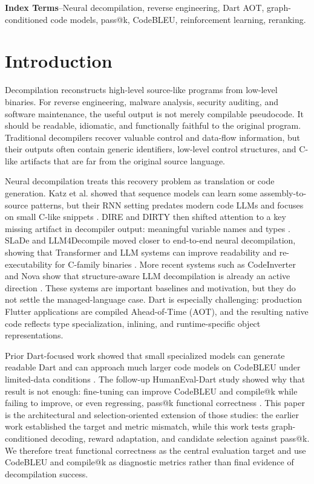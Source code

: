 \documentclass[11pt]{article}
\begin{document}
\noindent\textbf{Index Terms}--Neural decompilation, reverse engineering, Dart AOT, graph-conditioned code models, pass@k, CodeBLEU, reinforcement learning, reranking.

\section{Introduction}

Decompilation reconstructs high-level source-like programs from low-level binaries. For reverse engineering, malware analysis, security auditing, and software maintenance, the useful output is not merely compilable pseudocode. It should be readable, idiomatic, and functionally faithful to the original program. Traditional decompilers recover valuable control and data-flow information, but their outputs often contain generic identifiers, low-level control structures, and C-like artifacts that are far from the original source language.

Neural decompilation treats this recovery problem as translation or code generation. Katz et al. showed that sequence models can learn some assembly-to-source patterns, but their RNN setting predates modern code LLMs and focuses on small C-like snippets \cite{katz2018rnn}. DIRE and DIRTY then shifted attention to a key missing artifact in decompiler output: meaningful variable names and types \cite{lacomis2019dire,chen2022dirty}. SLaDe and LLM4Decompile moved closer to end-to-end neural decompilation, showing that Transformer and LLM systems can improve readability and re-executability for C-family binaries \cite{armengol2023slade,tan2024llm4decompile}. More recent systems such as CodeInverter and Nova show that structure-aware LLM decompilation is already an active direction \cite{liu2025codeinverter,jiang2025nova}. These systems are important baselines and motivation, but they do not settle the managed-language case. Dart is especially challenging: production Flutter applications are compiled Ahead-of-Time (AOT), and the resulting native code reflects type specialization, inlining, and runtime-specific object representations.

Prior Dart-focused work showed that small specialized models can generate readable Dart and can approach much larger code models on CodeBLEU under limited-data conditions \cite{abualazm2026idiomatic}. The follow-up HumanEval-Dart study showed why that result is not enough: fine-tuning can improve CodeBLEU and compile@k while failing to improve, or even regressing, pass@k functional correctness \cite{abualazm2026tosem}. This paper is the architectural and selection-oriented extension of those studies: the earlier work established the target and metric mismatch, while this work tests graph-conditioned decoding, reward adaptation, and candidate selection against pass@k. We therefore treat functional correctness as the central evaluation target and use CodeBLEU and compile@k as diagnostic metrics rather than final evidence of decompilation success.
\end{document}
